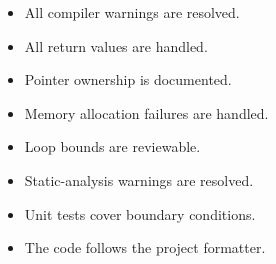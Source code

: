 \begin{itemize}
    \item[\(\square\)]  All compiler warnings are resolved.
    \item[\(\square\)]  All return values are handled.
    \item[\(\square\)]  Pointer ownership is documented.
    \item[\(\square\)]  Memory allocation failures are handled.
    \item[\(\square\)]  Loop bounds are reviewable.
    \item[\(\square\)]  Static-analysis warnings are resolved.
    \item[\(\square\)]  Unit tests cover boundary conditions.
    \item[\(\square\)]  The code follows the project formatter.
\end{itemize}
